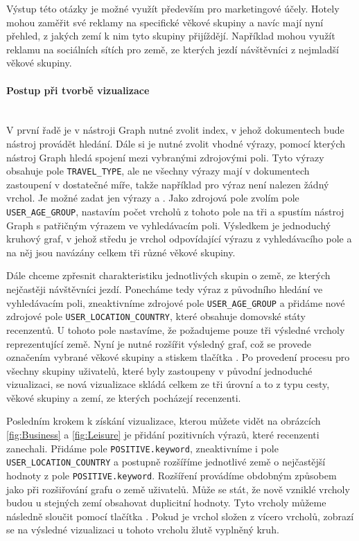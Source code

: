 \documentclass[czech,BP]{thesiskiv}
\begin{document}
Výstup této otázky je možné využít především pro marketingové účely. Hotely mohou zaměřit své reklamy na specifické věkové skupiny a navíc mají nyní přehled, z jakých zemí k nim tyto skupiny přijíždějí. Například mohou využít reklamu na sociálních sítích pro země, ze kterých jezdí návštěvníci z nejmladší věkové skupiny.

\paragraph{Postup při tvorbě vizualizace}
\mbox{}\\
V první řadě je v nástroji Graph nutné zvolit index, v jehož dokumentech bude nástroj provádět hledání. Dále si je nutné zvolit vhodné výrazy, pomocí kterých nástroj Graph hledá spojení mezi vybranými zdrojovými poli. Tyto výrazy obsahuje pole \texttt{TRAVEL\_TYPE}, ale ne všechny výrazy mají v dokumentech zastoupení v dostatečné míře, takže například pro výraz  není nalezen žádný vrchol. Je možné zadat jen výrazy  a . Jako zdrojová pole zvolím pole \texttt{USER\_AGE\_GROUP}, nastavím počet vrcholů z tohoto pole na tři a spustím nástroj Graph s patřičným výrazem ve vyhledávacím poli. Výsledkem je jednoduchý kruhový graf, v jehož středu je vrchol odpovídající výrazu z vyhledávacího pole a na něj jsou navázány celkem tři různé věkové skupiny.


Dále chceme zpřesnit charakteristiku jednotlivých skupin o země, ze kterých nejčastěji návštěvníci jezdí. Ponecháme tedy výraz z původního hledání ve vyhledávacím poli, zneaktivníme zdrojové pole \texttt{USER\_AGE\_GROUP} a přidáme nové zdrojové pole \texttt{USER\_LOCATION\_COUNTRY}, které obsahuje domovské státy recenzentů. U tohoto pole nastavíme, že požadujeme pouze tři výsledné vrcholy reprezentující země. Nyní je nutné rozšířit výsledný graf, což se provede označením vybrané věkové skupiny a stiskem tlačítka . Po provedení procesu \textbf{} pro všechny skupiny uživatelů, které byly zastoupeny v původní jednoduché vizualizaci, se nová vizualizace skládá celkem ze tři úrovní a to z typu cesty, věkové skupiny a zemí, ze kterých pocházejí recenzenti.


Posledním krokem k získání vizualizace, kterou můžete vidět na obrázcích \ref{fig:Business} a \ref{fig:Leisure} je přidání pozitivních výrazů, které recenzenti zanechali. Přidáme pole \texttt{POSITIVE.key\-word}, zneaktivníme i pole \texttt{USER\_LOCATION\_COUN\-TRY} a postupně rozšíříme jednotlivé země o nejčastější hodnoty z pole \texttt{POSITIVE.key\-word}. Rozšíření provádíme obdobným způsobem jako při rozšiřování grafu o země uživatelů. Může se stát, že nově vzniklé vrcholy budou u stejných zemí obsahovat duplicitní hodnoty. Tyto vrcholy můžeme následně sloučit pomocí tlačítka . Pokud je vrchol složen z vícero vrcholů, zobrazí se na výsledné vizualizaci u tohoto vrcholu žlutě vyplněný kruh.
\end{document}

